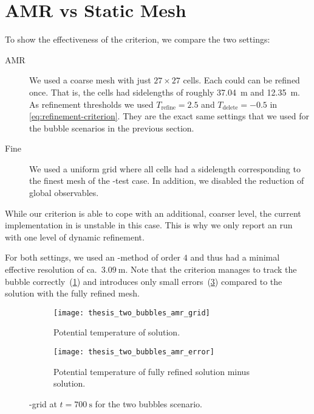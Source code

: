 \section{AMR vs Static Mesh}\label{sec:results-tts-amr}
To show the effectiveness of the \amr{} criterion, we compare the two settings:
\begin{description}
\item[AMR] We used a coarse mesh with just $27 \times 27$ cells.
  Each could can be refined once.
  That is, the cells had sidelengths of roughly \SI{37.04}{\m} and  \SI{12.35}{\m}.
  As refinement thresholds we used $T_\text{refine} = 2.5$ and $T_\text{delete} = -0.5$ in \cref{eq:refinement-criterion}.
  They are the exact same settings that we used for the bubble scenarios in the previous section.
\item[Fine] We used a uniform grid where all cells had a sidelength corresponding to the finest mesh of the \amr{}-test case.
  In addition, we disabled the reduction of global observables.
\end{description}
While our \amr{} criterion is able to cope with an additional, coarser level, the current implementation in \exahype{} is unstable in this case.
This is why we only report an \amr{} run with one level of dynamic refinement.

For both settings, we used an \aderdg{}-method of order $4$ and thus had a minimal effective resolution of ca.\ $\SI{3.09}{\m}$.
Note that the \amr{} criterion manages to track the bubble correctly~(\cref{fig:two-bubbles-amr-grid}) and introduces only small errors~(\cref{fig:two-bubbles-amr-error}) compared to the solution with the fully refined mesh.

\begin{figure}[htb]
\centering
\begin{subfigure}[t]{0.45\textwidth}
    \centering
    \texttt{[image: thesis\_two\_bubbles\_amr\_grid]} 
    \caption{\label{fig:two-bubbles-amr-grid}%
      Potential temperature of \amr{} solution.}
\end{subfigure}\qquad%
\begin{subfigure}[t]{0.45\textwidth}
    \centering
    \texttt{[image: thesis\_two\_bubbles\_amr\_error]} 
    \caption{\label{fig:two-bubbles-amr-error}%
      Potential temperature of fully refined solution minus \amr{} solution.}
\end{subfigure}

  \caption{%
    \amr{}-grid at $t = \SI{700}{\s}$ for the two bubbles scenario.}
\end{figure}

